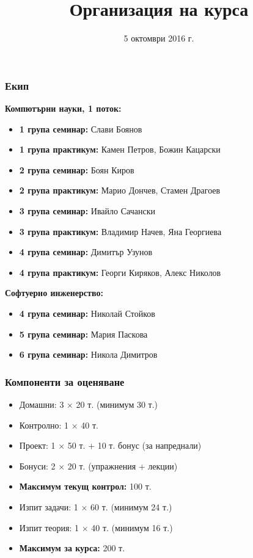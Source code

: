 \documentclass{beamer}
\title{Организация на курса}
\date{5 октомври 2016 г.}
\begin{document}
\begin{frame}
  \titlepage
\end{frame}

\begin{frame}
  \frametitle{Екип}

  \textbf{Компютърни науки, 1 поток:}
  \begin{itemize}
  \item \textbf{1 група семинар:} Слави Боянов
  \item \textbf{1 група практикум:} Камен Петров, Божин Кацарски
  \item \textbf{2 група семинар:} Боян Киров
  \item \textbf{2 група практикум:} Марио Дончев, Стамен Драгоев
  \item \textbf{3 група семинар:} Ивайло Сачански
  \item \textbf{3 група практикум:} Владимир Начев, Яна Георгиева
  \item \textbf{4 група семинар:} Димитър Узунов
  \item \textbf{4 група практикум:} Георги Киряков, Алекс Николов
  \end{itemize}
  \textbf{Софтуерно инженерство:}
  \begin{itemize}
  \item \textbf{4 група семинар:} Николай Стойков
  \item \textbf{5 група семинар:} Мария Паскова
  \item \textbf{6 група семинар:} Никола Димитров
  \end{itemize}
\end{frame}

\begin{frame}
  \frametitle{Компоненти за оценяване}
  
  \begin{itemize}
  \item Домашни: 3 $\times$ 20 т. \alert{(минимум 30 т.)}
  \item Контролно: 1 $\times$ 40 т.
  \item Проект: 1 $\times$ 50 т. + 10 т. бонус (за напреднали)
  \item Бонуси: 2 $\times$ 20 т. (упражнения + лекции)
  \item \textbf{Максимум текущ контрол:} 100 т.
  \item Изпит задачи: 1 $\times$ 60 т. \alert{(минимум 24 т.)}
  \item Изпит теория: 1 $\times$ 40 т. \alert{(минимум 16 т.)}
  \item \textbf{Максимум за курса:} 200 т.
  \end{itemize}
\end{frame}
\end{document}
